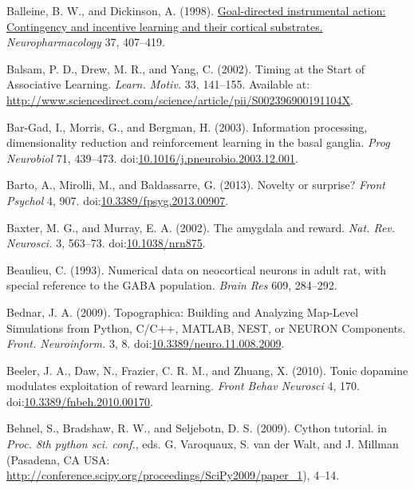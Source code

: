 \documentclass[
  11pt,
  a4paper,
]{scrbook}
\newlength{\cslhangindent}
\newenvironment{CSLReferences}[2] %
 {\begin{list}{}{%
  \setlength{\itemindent}{0pt}
  \setlength{\leftmargin}{0pt}
  \setlength{\parsep}{0pt}
  \ifodd #1
   \setlength{\leftmargin}{\cslhangindent}
   \setlength{\itemindent}{-1\cslhangindent}
  \fi
  \setlength{\itemsep}{#2\baselineskip}}}
 {\end{list}}
\begin{document}
\begin{CSLReferences}{1}{1}
Balleine, B. W., and Dickinson, A. (1998).
\href{https://www.ncbi.nlm.nih.gov/pubmed/9704982}{Goal-directed
instrumental action: Contingency and incentive learning and their
cortical substrates.} \emph{Neuropharmacology} 37, 407--419.

Balsam, P. D., Drew, M. R., and Yang, C. (2002). {Timing at the Start of
Associative Learning}. \emph{Learn. Motiv.} 33, 141--155. Available at:
\url{http://www.sciencedirect.com/science/article/pii/S002396900191104X}.

Bar-Gad, I., Morris, G., and Bergman, H. (2003). Information processing,
dimensionality reduction and reinforcement learning in the basal
ganglia. \emph{Prog Neurobiol} 71, 439--473.
doi:\href{https://doi.org/10.1016/j.pneurobio.2003.12.001}{10.1016/j.pneurobio.2003.12.001}.

Barto, A., Mirolli, M., and Baldassarre, G. (2013). Novelty or surprise?
\emph{Front Psychol} 4, 907.
doi:\href{https://doi.org/10.3389/fpsyg.2013.00907}{10.3389/fpsyg.2013.00907}.

Baxter, M. G., and Murray, E. A. (2002). {The amygdala and reward.}
\emph{Nat. Rev. Neurosci.} 3, 563--73.
doi:\href{https://doi.org/10.1038/nrn875}{10.1038/nrn875}.

Beaulieu, C. (1993). Numerical data on neocortical neurons in adult rat,
with special reference to the {GABA} population. \emph{Brain Res} 609,
284--292.

Bednar, J. A. (2009). {Topographica: Building and Analyzing Map-Level
Simulations from Python, C/C++, MATLAB, NEST, or NEURON Components.}
\emph{Front. Neuroinform.} 3, 8.
doi:\href{https://doi.org/10.3389/neuro.11.008.2009}{10.3389/neuro.11.008.2009}.

Beeler, J. A., Daw, N., Frazier, C. R. M., and Zhuang, X. (2010). Tonic
dopamine modulates exploitation of reward learning. \emph{Front Behav
Neurosci} 4, 170.
doi:\href{https://doi.org/10.3389/fnbeh.2010.00170}{10.3389/fnbeh.2010.00170}.

Behnel, S., Bradshaw, R. W., and Seljebotn, D. S. (2009). {Cython
tutorial}. in \emph{Proc. 8th python sci. conf.}, eds. G. Varoquaux, S.
van der Walt, and J. Millman (Pasadena, CA USA:
\url{http://conference.scipy.org/proceedings/SciPy2009/paper_1}), 4--14.


\end{CSLReferences}
\end{document}
